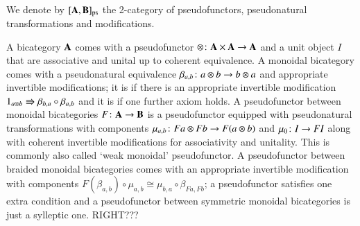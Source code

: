 \documentclass[reqno]{amsart}
\begin{document}
We denote by $[\mathbf{A},\mathbf{B}]_{\mathrm{ps}}$ the 2-category 
of pseudofunctors, pseudonatural transformations and modifications.

A  bicategory $\mathbf{A}$ comes with a pseudofunctor $\otimes\colon\mathbf{A}\times\mathbf{A}\to\mathbf{A}$ and a unit object $I$ that are associative and unital up to coherent equivalence. A  monoidal bicategory comes with a pseudonatural equivalence $\beta_{a,b}\colon a\otimes b\to b\otimes a$ and appropriate invertible modifications; it is  if there is an appropriate invertible modification $1_{a\otimes b}\Rrightarrow\beta_{b,a}\circ\beta_{a,b}$ and it is  if one further axiom holds. A  pseudofunctor between monoidal bicategories $F\colon\mathbf{A}\to\mathbf{B}$ is a pseudofunctor equipped with pseudonatural transformations with components $\mu_{a,b}\colon Fa\otimes Fb\to F(a\otimes b)$ and $\mu_0\colon I\to FI$ along with coherent invertible modifications for associativity and unitality. This is commonly also called `weak monoidal' pseudofunctor. A  pseudofunctor between braided monoidal bicategories comes with an appropriate invertible modification with components $F(\beta_{a,b})\circ \mu_{a,b}\cong\mu_{b,a}\circ \beta_{Fa,Fb}$; a  pseudofunctor satisfies one extra condition and a  pseudofunctor between symmetric monoidal bicategories is just a sylleptic one. RIGHT???
\end{document}
